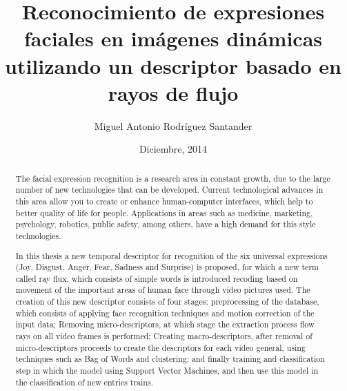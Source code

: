 \documentclass[final]{udpthesis}
\begin{document}
\frontmatter
\title{Reconocimiento de expresiones faciales en imágenes dinámicas utilizando un descriptor basado en rayos de flujo}

\author{Miguel Antonio Rodríguez Santander}

\date{Diciembre, 2014}


\dedicatory{}

\makecover

\tableofcontents%
\listoffigures%
\listoftables%

\begin{abstract}
The facial expression recognition is a research area in constant growth, due to the large number of new technologies that can be developed. Current technological advances in this area allow you to create or enhance human-computer interfaces, which help to better quality of life for people. Applications in areas such as medicine, marketing, psychology, robotics, public safety, among others, have a high demand for this style technologies.

In this thesis a new temporal descriptor for recognition of the six universal expressions (Joy, Disgust, Anger, Fear, Sadness and Surprise) is proposed, for which a new term called ray flux, which consists of simple words is introduced recoding based on movement of the important areas of human face through video pictures used. The creation of this new descriptor consists of four stages: preprocessing of the database, which consists of applying face recognition techniques and motion correction of the input data; Removing micro-descriptors, at which stage the extraction process flow rays on all video frames is performed; Creating macro-descriptors, after removal of micro-descriptors proceeds to create the descriptors for each video general, using techniques such as Bag of Words and clustering; and finally training and classification step in which the model using Support Vector Machines, and then use this model in the classification of new entries trains.
\end{abstract}
\end{document}
